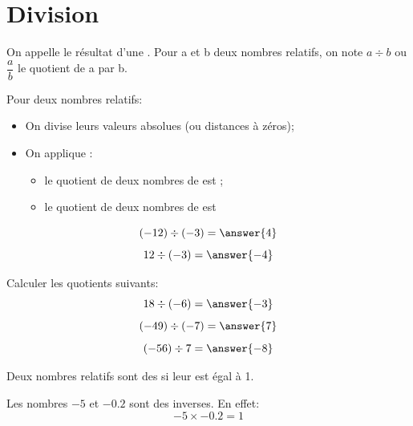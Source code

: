 \section{Division}

\begin{rappelbox}
    On appelle  le résultat d'une . Pour a et b deux nombres
    relatifs, on note $a\div b$ ou $\dfrac{a}{b}$ le quotient de a par b.
\end{rappelbox}

\begin{propbox}
    Pour  deux nombres relatifs: 
    \begin{itemize}
        \item On divise leurs valeurs absolues (ou distances à zéros);
        \item On applique  :
            \begin{itemize}[label=\textbullet]
                \item le quotient de deux nombres de  est  ;
                \item le quotient de deux nombres de  est 
            \end{itemize}
    \end{itemize}
\end{propbox}

\begin{exemplebox}
    $$ (-12)\div (-3)=\answer{4} $$
    $$ 12\div (-3)=\answer{-4} $$
\end{exemplebox}

\begin{exercicebox}
    Calculer les quotients suivants:
    $$18\div (-6) = \answer{-3}$$
    $$(-49)\div (-7) = \answer{7}$$
    $$(-56)\div 7 = \answer{-8}$$
\end{exercicebox}

\begin{definitionbox}
    Deux nombres relatifs sont des  si leur  est égal à 1.
\end{definitionbox}


\begin{exemplebox}
    Les nombres $-5$ et $-0.2$ sont des inverses. En effet:
    $$-5\times-0.2=1$$
\end{exemplebox}

